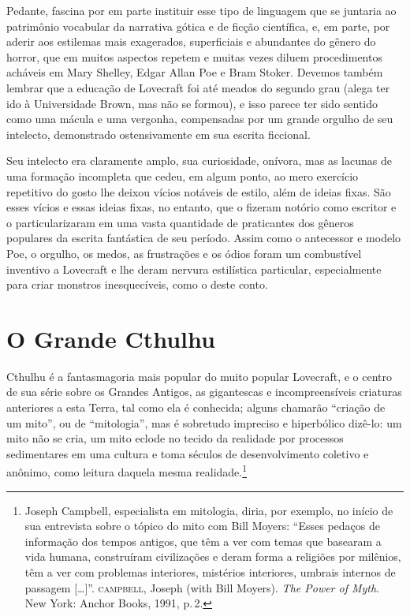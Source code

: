 Pedante, fascina por em parte instituir esse tipo de linguagem que se
juntaria ao patrimônio vocabular da narrativa gótica e de ficção
científica, e, em parte, por aderir aos estilemas mais exagerados,
superficiais e abundantes do gênero do horror, que em muitos aspectos
repetem e muitas vezes diluem procedimentos acháveis em Mary Shelley,
Edgar Allan Poe e Bram Stoker. Devemos também lembrar que a educação de
Lovecraft foi até meados do segundo grau (alega ter ido à Universidade
Brown, mas não se formou), e isso parece ter sido sentido como uma
mácula e uma vergonha, compensadas por um grande orgulho de seu
intelecto, demonstrado ostensivamente em sua escrita ficcional.

Seu intelecto era claramente amplo, sua curiosidade, onívora, mas as
lacunas de uma formação incompleta que cedeu, em algum ponto, ao mero
exercício repetitivo do gosto lhe deixou vícios notáveis de estilo, além de
ideias fixas. São esses vícios e essas ideias fixas, no entanto, que o
fizeram notório como escritor e o particularizaram em uma vasta
quantidade de praticantes dos gêneros populares da escrita fantástica de
seu período. Assim como o antecessor e modelo Poe, o orgulho, os medos,
as frustrações e os ódios foram um combustível inventivo a Lovecraft e lhe deram
nervura estilística particular, especialmente para criar monstros
inesquecíveis, como o deste conto.

\section{O Grande Cthulhu}

Cthulhu é a fantasmagoria mais popular do muito popular
Lovecraft, e o centro de sua série sobre os Grandes Antigos, as
gigantescas e incompreensíveis criaturas anteriores a esta Terra, tal
como ela é conhecida; alguns chamarão ``criação de um mito'', ou de 
``mitologia'', mas é sobretudo impreciso e hiperbólico dizê-lo: um mito
não se cria, um mito eclode no tecido da realidade por processos
sedimentares em uma cultura e toma séculos de desenvolvimento
coletivo e anônimo, como leitura daquela mesma realidade.\footnote{Joseph
  Campbell, especialista em mitologia, diria, por exemplo, no início de
  sua entrevista sobre o tópico do mito com Bill Moyers: ``Esses pedaços
  de informação dos tempos antigos, que têm a ver com temas que basearam
  a vida humana, construíram civilizações e deram forma a religiões por
  milênios, têm a ver com problemas interiores, mistérios interiores,
  umbrais internos de passagem [\ldots{}]''. \textsc{campbell}, Joseph (with Bill
  Moyers). \emph{The Power of Myth}. New York: Anchor Books, 1991, p.\,2.}

